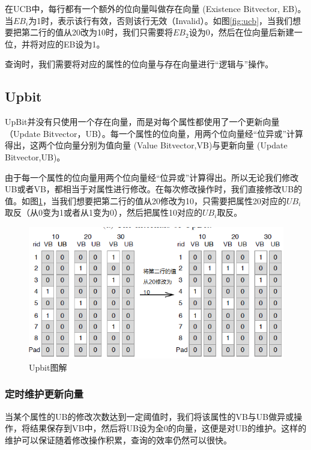 \documentclass[11pt, a4paper]{article}
\begin{document}
  在UCB中，每行都有一个额外的位向量叫做存在向量 (Existence Bitvector, EB)。当$EB_i$为1时，表示该行有效，否则该行无效（Invalid）。如图\ref{fig:ucb}，当我们想要把第二行的值从20改为10时，我们只需要将$EB_2$设为0，然后在位向量后新建一位，并将对应的EB设为1。

  查询时，我们需要将对应的属性的位向量与存在向量进行“逻辑与”操作。

  \subsection{Upbit}

  UpBit并没有只使用一个存在向量，而是对每个属性都使用了一个更新向量（Update Bitvector，UB）。每一个属性的位向量，用两个位向量经“位异或”计算得出，这两个位向量分别为值向量 (Value Bitvector,VB)与更新向量 (Update Bitvector,UB)。\cite{art1}

  由于每一个属性的位向量用两个位向量经“位异或”计算得出。所以无论我们修改UB或者VB，都相当于对属性进行修改。在每次修改操作时，我们直接修改UB的值。如图\ref{fig:upbit}，当我们想要把第二行的值从20修改为10，只需要把属性20对应的$UB_i$取反（从0变为1或者从1变为0），然后把属性10对应的$UB_i$取反。

  \begin{figure}[H]
    \begin{center}
      \includegraphics[width=5.5in]{upbit.png}
      \caption{Upbit图解}\label{fig:upbit}
    \end{center}
  \end{figure}

  \subsubsection{定时维护更新向量}

  当某个属性的UB的修改次数达到一定阈值时，我们将该属性的VB与UB做异或操作，将结果保存到VB中，然后将UB设为全0的向量，这便是对UB的维护。这样的维护可以保证随着修改操作积累，查询的效率仍然可以很快。
\end{document}
